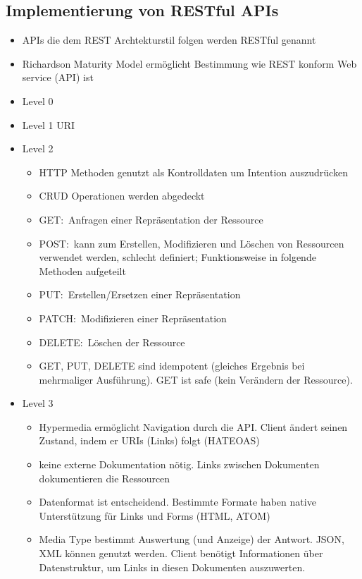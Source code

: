 \subsection{Implementierung von RESTful APIs}
\begin{itemize}
  \item APIs die dem REST Archtekturstil folgen werden RESTful genannt
  \item Richardson Maturity Model ermöglicht Bestimmung wie REST konform Web service (API) ist
  \item Level 0
  \item Level 1
  URI
  \item Level 2
  \begin{itemize}
    \item HTTP Methoden genutzt als Kontrolldaten um Intention auszudrücken
    \item CRUD Operationen werden abgedeckt
    \item GET:\ Anfragen einer Repräsentation der Ressource
    \item POST:\ kann zum Erstellen, Modifizieren und Löschen von Ressourcen verwendet werden, schlecht definiert; Funktionsweise in folgende Methoden aufgeteilt
    \item PUT:\ Erstellen/Ersetzen einer Repräsentation
    \item PATCH:\ Modifizieren einer Repräsentation
    \item DELETE:\ Löschen der Ressource
    \item GET, PUT, DELETE sind idempotent (gleiches Ergebnis bei mehrmaliger Ausführung). GET ist safe (kein Verändern der Ressource).
  \end{itemize}
  \item Level 3
  \begin{itemize}
    \item Hypermedia ermöglicht Navigation durch die API\@. Client ändert seinen Zustand, indem er URIs (Links) folgt (HATEOAS)
    \item keine externe Dokumentation nötig. Links zwischen Dokumenten dokumentieren die Ressourcen
    \item Datenformat ist entscheidend. Bestimmte Formate haben native Unterstützung für Links und Forms (HTML, ATOM)
    \item Media Type bestimmt Auswertung (und Anzeige) der Antwort. JSON, XML können genutzt werden. Client benötigt Informationen über Datenstruktur, um Links in diesen Dokumenten auszuwerten.
  \end{itemize}
\end{itemize}

